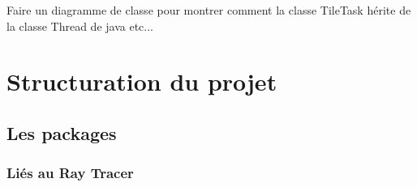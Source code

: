 \documentclass[11pt]{article}
\begin{document}
Faire un diagramme de classe pour montrer comment la classe TileTask hérite de la classe Thread de java etc...

\section{Structuration du projet}
\subsection{Les packages}
\subsubsection{Liés au Ray Tracer}
\end{document}
